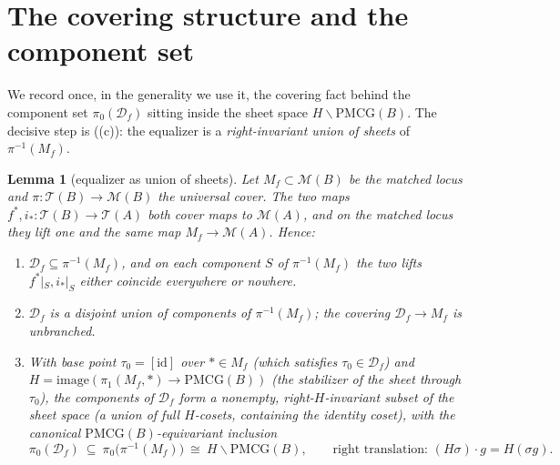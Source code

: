 \documentclass[11pt]{article}
\newtheorem{lemma}[theorem]{Lemma}
\theoremstyle{definition}
\theoremstyle{remark}
\newcommand{\Teich}{\mathcal T}
\newcommand{\MM}{\mathcal M}
\newcommand{\PMCG}{\mathrm{PMCG}}
\newcommand{\Df}{\mathcal D_f}
\begin{document}
\section{The covering structure and the component set}\label{sec:covering}

We record once, in the generality we use it, the covering fact behind
the component set $\pi_0(\Df)$ sitting inside the sheet space
$H\backslash\PMCG(B)$.  The decisive
step is \textup{(}(c)\textup{)}: the equalizer is a
\emph{right-invariant union of sheets} of $\pi^{-1}(M_f)$.

\begin{lemma}[equalizer as union of sheets]\label{lem:sheets}
Let $M_f\subset\MM(B)$ be the matched locus and
$\pi:\Teich(B)\to\MM(B)$ the universal cover.  The two maps
$f^*,i_*:\Teich(B)\to\Teich(A)$ both cover maps to $\MM(A)$, and on
the matched locus they lift one and the same map $M_f\to\MM(A)$.
Hence:
\begin{enumerate}[label=\textup{(}\alph*\textup{)}]
\item $\Df\subseteq\pi^{-1}(M_f)$, and on each component $S$ of
$\pi^{-1}(M_f)$ the two lifts $f^*|_S,i_*|_S$ either coincide
everywhere or nowhere.
\item $\Df$ is a disjoint union of components of $\pi^{-1}(M_f)$; the
covering $\Df\to M_f$ is unbranched.
\item With base point $\tau_0=[\mathrm{id}]$ over $\ast\in M_f$
\textup{(}which satisfies $\tau_0\in\Df$\textup{)} and
$H=\mathrm{image}(\pi_1(M_f,\ast)\to\PMCG(B))$ \textup{(}the
stabilizer of the sheet through $\tau_0$\textup{)}, the components of
$\Df$ form a \emph{nonempty, right-$H$-invariant subset} of the sheet
space \textup{(}a union of full $H$-cosets, containing the identity
coset\textup{)}, with the canonical $\PMCG(B)$-equivariant inclusion
\[
\pi_0(\Df)\ \subseteq\ \pi_0\bigl(\pi^{-1}(M_f)\bigr)\ \cong\
H\backslash\PMCG(B),
\qquad
\text{right translation: }(H\sigma)\cdot g=H(\sigma g).
\]
\end{enumerate}
\end{lemma}
\end{document}
